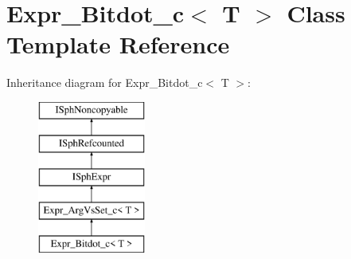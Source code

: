 \hypertarget{classExpr__Bitdot__c}{\section{Expr\-\_\-\-Bitdot\-\_\-c$<$ T $>$ Class Template Reference}
\label{classExpr__Bitdot__c}
}
Inheritance diagram for Expr\-\_\-\-Bitdot\-\_\-c$<$ T $>$\-:\begin{figure}[H]
\begin{center}
\leavevmode
\includegraphics[height=5.000000cm]{classExpr__Bitdot__c}
\end{center}
\end{figure}
